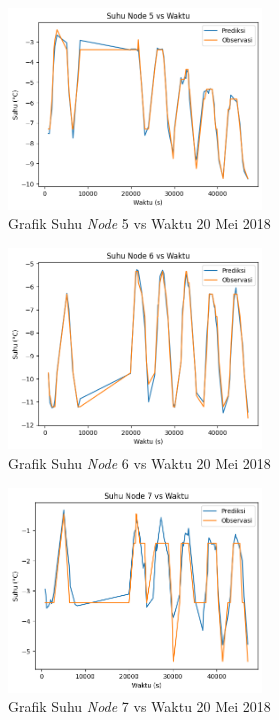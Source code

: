 \begin{figure}[H]
\setlength{}
\begin{center}
\includegraphics[width=0.6\textwidth]{fig/node5_temp_2018-05-20.png}
\caption{Grafik Suhu \textit{Node} 5 vs Waktu 20 Mei 2018}
\label{fig:node520}
\end{center}
\end{figure}

\begin{figure}[H]
\setlength{}
\begin{center}
\includegraphics[width=0.6\textwidth]{fig/node6_temp_2018-05-20.png}
\caption{Grafik Suhu \textit{Node} 6 vs Waktu 20 Mei 2018}
\label{fig:node620}
\end{center}
\end{figure}

\begin{figure}[H]
\setlength{}
\begin{center}
\includegraphics[width=0.6\textwidth]{fig/node7_temp_2018-05-20.png}
\caption{Grafik Suhu \textit{Node} 7 vs Waktu 20 Mei 2018}
\label{fig:node720}
\end{center}
\end{figure}

